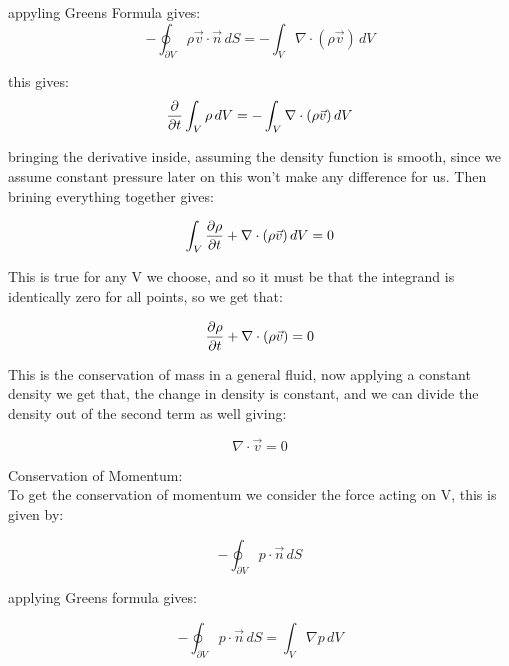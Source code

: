 \documentclass{article}
\begin{document}
\noindent appyling Greens Formula gives:
\begin{equation}
    \label{Greens formula}
    - \oint_{\partial V} \rho  \vec{v}\cdot \vec{n} \,dS = - \int_{V} \nabla \cdot (\rho\vec{v}) \,dV
\end{equation}

\noindent this gives:
\begin{equation}
    \label{Greens formula}
    {\partial \over \partial t}\int_V \rho \,dV = - \int_{V} \nabla \cdot (\rho\vec{v}) \,dV
\end{equation}

\noindent bringing the derivative inside, assuming the density function is smooth, since we assume constant pressure later on this won't make any difference for us. Then brining everything together gives:

\begin{equation}
    \label{Greens formula}
    \int_V {\partial \rho \over \partial t} + \nabla \cdot (\rho\vec{v}) \,dV = 0
\end{equation}

\noindent This is true for any V we choose, and so it must be that the integrand is identically zero for all points, so we get that:

\begin{equation}
    \label{Greens formula}
    {\partial \rho \over \partial t} + \nabla \cdot (\rho\vec{v}) = 0
\end{equation}

\noindent This is the conservation of mass in a general fluid, now applying a constant density we get that, the change in density is constant, and we can divide the density out of the second term as well giving:

\begin{equation}
    \label{Greens formula}
    \nabla \cdot \vec{v} = 0
\end{equation}

\noindent Conservation of Momentum: \\

\noindent To get the conservation of momentum we consider the force acting on V, this is given by:

\begin{equation}
    \label{Flow out of V}
     - \oint_{\partial V} p\cdot \vec{n} \,dS
\end{equation}

\noindent applying Greens formula gives:

\begin{equation}
    \label{Flow out of V}
     - \oint_{\partial V} p\cdot \vec{n} \,dS = \int_{V} \nabla p \,dV
\end{equation}
\end{document}
